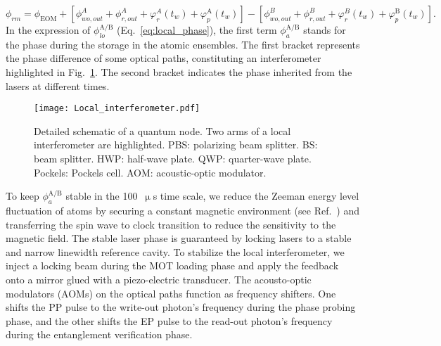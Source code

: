 \documentclass[aps,reprint,showpacs,superscriptaddress]{revtex4-2}
\begin{document}
\begin{equation}\label{eq:remote_phase}
	\phi_{rm}=\phi_\textrm{EOM}+[\phi_{wo,out}^A+\phi_{r,out}^A+\varphi_r^A(t_w)+\varphi_p^\textrm{A}(t_w)]-[\phi_{wo,out}^B+\phi_{r,out}^B+\varphi_r^B(t_w)+\varphi_p^\textrm{B}(t_w)].
\end{equation}
In the expression of $\phi^\textrm{A/B}_{lo}$ (Eq.~\ref{eq:local_phase}), the first term $\phi_a^\textrm{A/B}$ stands for the phase during the storage in the atomic ensembles. The first bracket represents the phase difference of some optical paths, constituting an interferometer highlighted in Fig.~\ref{fig:optical_paths_phase}. The second bracket indicates the phase inherited from the lasers at different times. 

\begin{figure}[htbp]
	\centering
	\texttt{[image: Local\_interferometer.pdf]}
	\caption{Detailed schematic of a quantum node. Two arms of a local interferometer are highlighted. PBS: polarizing beam splitter. BS: beam splitter. HWP: half-wave plate. QWP: quarter-wave plate. Pockels: Pockels cell. AOM: acoustic-optic modulator.}
	\label{fig:optical_paths_phase}
\end{figure}
To keep $\phi_a^\textrm{A/B}$ stable in the 100~$\upmu$s time scale, we reduce the Zeeman energy level fluctuation of atoms by securing a constant magnetic environment (see Ref.~\cite{luo2022sm}) and transferring the spin wave to clock transition to reduce the sensitivity to the magnetic field. The stable laser phase is guaranteed by locking lasers to a stable and narrow linewidth reference cavity. To stabilize the local interferometer, we inject a locking beam during the MOT loading phase and apply the feedback onto a mirror glued with a piezo-electric transducer. The acousto-optic modulators (AOMs) on the optical paths function as frequency shifters. One shifts the PP pulse to the write-out photon's frequency during the phase probing phase, and the other shifts the EP pulse to the read-out photon's frequency during the entanglement verification phase. 
\end{document}
